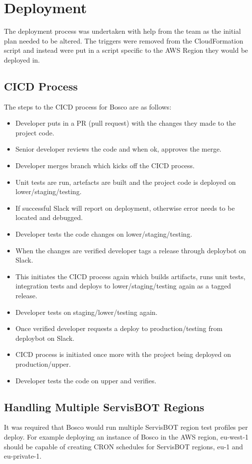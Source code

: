 \documentclass[12pt,a4paper,titlepage]{report}
\begin{document}
\chapter{Deployment}
The deployment process was undertaken with help from the team as the initial plan needed to be altered. The triggers were removed from the 
 CloudFormation script and instead were put in a script specific to the AWS Region they would be deployed in. 

\section{CICD Process}
The steps to the CICD process for Bosco are as follows:

\begin{itemize}
  \item Developer puts in a PR (pull request) with the changes they made to the project code.
  \item Senior developer reviews the code and when ok, approves the merge.
  \item Developer merges branch which kicks off the CICD process. 
  \item Unit tests are run, artefacts are built and the project code is deployed on lower/staging/testing.
  \item If successful Slack will report on deployment, otherwise error needs to be located and debugged. 
  \item Developer tests the code changes on lower/staging/testing.
  \item When the changes are verified developer tags a release through deploybot on Slack.
  \item This initiates the CICD process again which builds artifacts, runs unit tests, integration tests and deploys to lower/staging/testing again as a tagged release.
  \item Developer tests on staging/lower/testing again.
  \item Once verified developer requests a deploy to production/testing from deploybot on Slack.
  \item CICD process is initiated once more with the project being deployed on production/upper.
  \item Developer tests the code on upper and verifies.
\end{itemize}

\section{Handling Multiple ServisBOT Regions}
It was required that Bosco would run multiple ServisBOT region test profiles per deploy. For example deploying an instance of 
Bosco in the AWS region, eu-west-1 should be capable of creating CRON schedules for ServisBOT regions, eu-1 and eu-private-1. 
\end{document}
